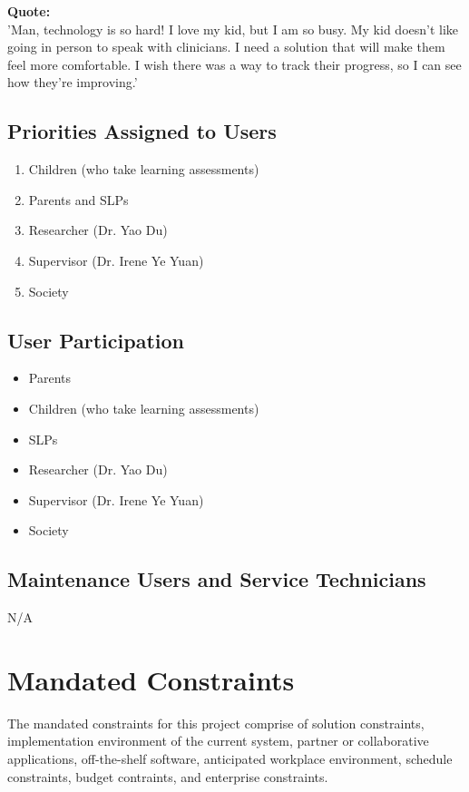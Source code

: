 \documentclass[12pt]{article}
\begin{document}
\textbf{Quote:}\\
'Man, technology is so hard! I love my kid, but I am so busy. My kid doesn't like going in person to speak with clinicians. I need a solution that will make them feel more comfortable. I wish there was a way to track their progress, so I can see how they're improving.'\\

\subsection{Priorities Assigned to Users}
\begin{enumerate}
  \item Children (who take learning assessments)
  \item Parents and SLPs
  \item Researcher (Dr. Yao Du)
  \item Supervisor (Dr. Irene Ye Yuan)
  \item Society
\end{enumerate}
\subsection{User Participation}
\begin{itemize}
  \item Parents
  \item Children (who take learning assessments)
  \item SLPs
  \item Researcher (Dr. Yao Du)
  \item Supervisor (Dr. Irene Ye Yuan)
  \item Society
\end{itemize}

\subsection{Maintenance Users and Service Technicians}
N/A\\

\newpage

\section{Mandated Constraints}
\hspace{2em}The mandated constraints for this project comprise of solution constraints, implementation environment of the current system, partner or collaborative applications,
off-the-shelf software, anticipated workplace environment, schedule constraints, budget contraints, and enterprise constraints.
\end{document}
